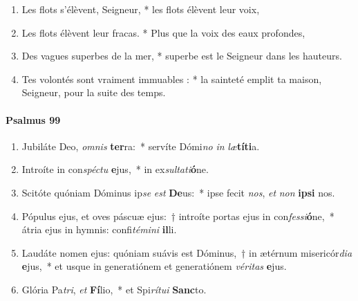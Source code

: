\documentclass[twoside]{article}
\begin{document}
\begin{paracol}[1]{2}
\begin{enumerate}[wide, itemsep=0mm, labelwidth=!, labelindent=0pt, label=\color{gregoriocolor}\theenumi]
\item Les flots s'élèvent, Seigneur, *
les flots élèvent leur voix,

\item Les flots élèvent leur fracas. *
Plus que la voix des eaux profondes,

\item Des vagues superbes de la mer, *
superbe est le Seigneur dans les hauteurs.

\item Tes volontés sont vraiment immuables : *
la sainteté emplit ta maison, Seigneur, pour la suite des temps.

\end{enumerate}

\switchcolumn*
\paragraph{Psalmus 99}


\begin{enumerate}[wide, itemsep=0mm, labelwidth=!, labelindent=0pt, label=\color{gregoriocolor}\theenumi]
\item Jubiláte Deo, \textit{om}\textit{nis} \textbf{ter}ra:~* servíte Dómi\textit{no} \textit{in} \textit{læ}\textbf{tí}\textbf{ti}a.

\item Introíte in con\textit{spéc}\textit{tu} \textbf{e}jus,~* in ex\textit{sul}\textit{ta}\textit{ti}\textbf{ó}ne.

\item Scitóte quóniam Dóminus ip\textit{se} \textit{est} \textbf{De}us:~* ipse fecit \textit{nos}, \textit{et} \textit{non} \textbf{ip}\textbf{si} nos.

\item Pópulus ejus, et oves páscuæ ejus:~† introíte portas ejus in con\textit{fes}\textit{si}\textbf{ó}ne,~* átria ejus in hymnis: confi\textit{té}\textit{mi}\textit{ni} \textbf{il}li.

\item Laudáte nomen ejus: quóniam suávis est Dóminus,~† in ætérnum misericór\textit{di}\textit{a} \textbf{e}jus,~* et usque in generatiónem et generatiónem \textit{vé}\textit{ri}\textit{tas} \textbf{e}jus.

\item Glória Pa\textit{tri}, \textit{et} \textbf{Fí}lio,~* et Spi\textit{rí}\textit{tu}\textit{i} \textbf{Sanc}to.


\end{enumerate}
\end{paracol}
\end{document}
